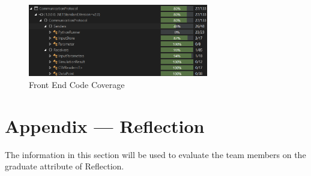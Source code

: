 \documentclass[12pt, titlepage]{article}
\begin{document}
\begin{figure}[H]
  \begin{center}
   \includegraphics[width=0.7\textwidth]{CSUnitTestCoverage.png}
  \caption{Front End Code Coverage}
  \label{Fig_Home} 
  \end{center}
\end{figure}





\newpage{}
\section*{Appendix --- Reflection}

The information in this section will be used to evaluate the team members on the
graduate attribute of Reflection.


\end{document}
